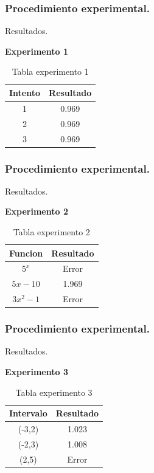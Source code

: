 \documentclass{beamer}
\begin{document}
\begin{frame}

\frametitle{Procedimiento experimental.}
{\LARGE Resultados.}

\textbf{Experimento 1}
\begin{table}[!ht]
\begin{center}
\begin{tabular}{|c|c|}\hline
{\bf Intento} & {\bf Resultado}\\ \hline
1 & 0.969\\
2 & 0.969\\
3 & 0.969\\
\hline
\end{tabular}
\end{center}
\caption{Tabla experimento 1}
\label{Mitabla}
\end{table}
\end{frame}

\begin{frame}
\frametitle{Procedimiento experimental.}
{\LARGE Resultados.}

\textbf{Experimento 2}
\begin{table}[!ht]
\begin{center}
\begin{tabular}{|c|c|}\hline
{\bf Funcion} & {\bf Resultado}\\ \hline
$5^x$ & Error\\
$5x-10$ & 1.969\\
$3x^2-1$ & Error\\
\hline
\end{tabular}
\end{center}
\caption{Tabla experimento 2}
\label{Mitabla2}
\end{table}
\end{frame}

\begin{frame}
\frametitle{Procedimiento experimental.}
{\LARGE Resultados.}

\textbf{Experimento 3}
\begin{table}[!h]
\begin{center}
\begin{tabular}{|c|c|}\hline
{\bf Intervalo} & {\bf Resultado}\\ \hline
(-3,2) & 1.023\\
(-2,3) & 1.008\\
(2,5) & Error\\%
\hline
\end{tabular}
\end{center}
\caption{Tabla experimento 3}
\label{Mitabla3}
\end{table}
\end{frame}
\end{document}
